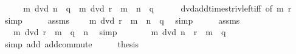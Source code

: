 \begin{isabellebody}
%
\isadelimproof
%
\endisadelimproof
%
\isatagproof
{}\isamarkupfalse%
\ {\isacharminus}{\kern0pt}\isanewline
\ \ \isamarkupfalse%
\ {\isachardoublequoteopen}m\ dvd\ n\ {\isacharminus}{\kern0pt}\ q\ {\isasymlongleftrightarrow}\ m\ dvd\ r\ {\isacharasterisk}{\kern0pt}\ m\ {\isacharplus}{\kern0pt}\ {\isacharparenleft}{\kern0pt}n\ {\isacharminus}{\kern0pt}\ q{\isacharparenright}{\kern0pt}{\isachardoublequoteclose}\isanewline
\ \ \ \ \isamarkupfalse%
\ dvd{\isacharunderscore}{\kern0pt}add{\isacharunderscore}{\kern0pt}times{\isacharunderscore}{\kern0pt}triv{\isacharunderscore}{\kern0pt}left{\isacharunderscore}{\kern0pt}iff\ {\isacharbrackleft}{\kern0pt}of\ m\ r{\isacharbrackright}{\kern0pt}\ \isamarkupfalse%
\ simp\isanewline
\ \ \isamarkupfalse%
\ \isamarkupfalse%
\ assms\ \isamarkupfalse%
\ {\isachardoublequoteopen}{\isasymdots}\ {\isasymlongleftrightarrow}\ m\ dvd\ r\ {\isacharasterisk}{\kern0pt}\ m\ {\isacharplus}{\kern0pt}\ n\ {\isacharminus}{\kern0pt}\ q{\isachardoublequoteclose}\ \isamarkupfalse%
\ simp\isanewline
\ \ \isamarkupfalse%
\ \isamarkupfalse%
\ assms\ \isamarkupfalse%
\ {\isachardoublequoteopen}{\isasymdots}\ {\isasymlongleftrightarrow}\ m\ dvd\ {\isacharparenleft}{\kern0pt}r\ {\isacharasterisk}{\kern0pt}\ m\ {\isacharminus}{\kern0pt}\ q{\isacharparenright}{\kern0pt}\ {\isacharplus}{\kern0pt}\ n{\isachardoublequoteclose}\ \isamarkupfalse%
\ simp\isanewline
\ \ \isamarkupfalse%
\ \isamarkupfalse%
\ {\isachardoublequoteopen}{\isasymdots}\ {\isasymlongleftrightarrow}\ m\ dvd\ n\ {\isacharplus}{\kern0pt}\ {\isacharparenleft}{\kern0pt}r\ {\isacharasterisk}{\kern0pt}\ m\ {\isacharminus}{\kern0pt}\ q{\isacharparenright}{\kern0pt}{\isachardoublequoteclose}\ \isamarkupfalse%
\ {\isacharparenleft}{\kern0pt}simp\ add{\isacharcolon}{\kern0pt}\ add{\isachardot}{\kern0pt}commute{\isacharparenright}{\kern0pt}\isanewline
\ \ \isamarkupfalse%
\ \isamarkupfalse%
\ {\isacharquery}{\kern0pt}thesis\ \isacommand{{\isachardot}{\kern0pt}}\isamarkupfalse%
\isanewline
{}\isamarkupfalse%
%
\endisatagproof
{\isafoldproof}%
%
\isadelimproof
%
\endisadelimproof
%
\isadelimdocument
%
\endisadelimdocument
%
\isatagdocument
%
\isamarkuptrue%
%
\endisatagdocument
{\isafolddocument}%
%
\isadelimdocument
%
\endisadelimdocument
{}\isamarkupfalse%

\end{isabellebody}
